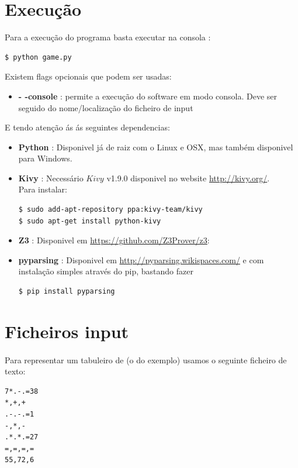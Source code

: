 \documentclass{article}
\begin{document}
\section{Execução}
Para a execução do programa basta executar na consola :
\begin{verbatim}
$ python game.py
\end{verbatim}

Existem flags opcionais que podem ser usadas:
\begin{itemize}
\item{ {\bf{- -console}} : permite a execução do software em modo consola. Deve ser seguido do nome/localização do ficheiro de input}
\end{itemize}

E tendo atenção ás ás seguintes dependencias:
\begin{itemize}
\item{ {\bf{Python}} : Disponivel já de raiz com o Linux e OSX, mas também disponivel para Windows.}
\item{ {\bf{Kivy}} : Necessário $Kivy$ v1.9.0 disponivel no website {\url{http://kivy.org/}}.
\\
Para instalar:
\begin{verbatim}
$ sudo add-apt-repository ppa:kivy-team/kivy
$ sudo apt-get install python-kivy
\end{verbatim}
}
\item{ {\bf{Z3}} : Disponivel em {\url{https://github.com/Z3Prover/z3}}:}
\item{ {\bf{pyparsing}} :  Disponivel em {\url{http://pyparsing.wikispaces.com/}} e com instalação simples através do pip, bastando fazer 
\begin{verbatim}
$ pip install pyparsing
\end{verbatim}
}
\end{itemize}

\section{Ficheiros input}

\paragraph{} 

Para representar um tabuleiro de {} (o do exemplo) usamos o seguinte ficheiro de texto:
\begin{center}
\begin{verbatim}
7*.-.=38
*,+,+
.-.-.=1
-,*,-
.*.*.=27
=,=,=,=
55,72,6
\end{verbatim}
\end{center}
\end{document}
